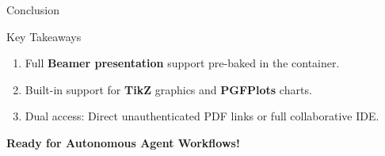 \documentclass[aspectratio=169]{beamer}
\begin{document}
\begin{frame}{Conclusion}
  \begin{exampleblock}{Key Takeaways}
    \begin{enumerate}
      \item Full \textbf{Beamer presentation} support pre-baked in the container.
      \item Built-in support for \textbf{TikZ} graphics and \textbf{PGFPlots} charts.
      \item Dual access: Direct unauthenticated PDF links or full collaborative IDE.
    \end{enumerate}
  \end{exampleblock}
  \vspace{0.5cm}
  \centering
  \textbf{Ready for Autonomous Agent Workflows!}
\end{frame}
\end{document}
